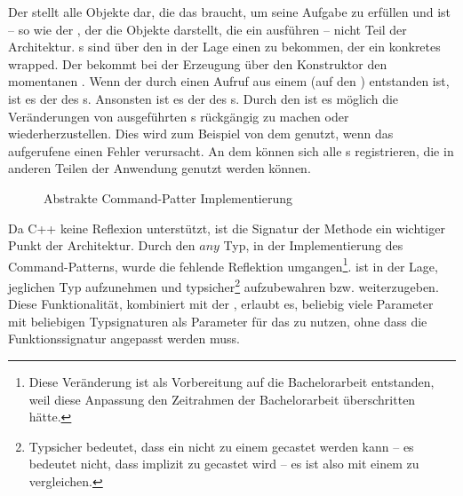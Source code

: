      Der  stellt alle Objekte dar, die das  braucht, um seine Aufgabe zu erfüllen und ist -- so wie der , der die Objekte darstellt, die ein  ausführen -- nicht Teil der Architektur. s sind über den  in der Lage einen  zu bekommen, der ein konkretes  wrapped. Der  bekommt bei der Erzeugung über den Konstruktor den momentanen . Wenn der  durch einen Aufruf aus einem  (auf den ) entstanden ist, ist es der  des s. Ansonsten ist es der  des s. Durch den  ist es möglich die Veränderungen von ausgeführten s rückgängig zu machen oder wiederherzustellen. Dies wird zum Beispiel von dem  genutzt, wenn das aufgerufene  einen Fehler verursacht. An dem  können sich alle s registrieren, die in anderen Teilen der Anwendung genutzt werden können.

      \begin{figure}[H]
        \centering
        \caption{Abstrakte Command-Patter Implementierung}
        \label{fig:commanduml}
      \end{figure}

      Da C++ keine Reflexion \autocites{vinoski2005time}{ferber1989computational} unterstützt, ist die Signatur der  Methode ein wichtiger Punkt der Architektur. Durch den \myTIn$any$ \autocite{cpp-fundamentals} Typ, in der Implementierung des Command-Patterns, wurde die fehlende Reflektion umgangen\footnote{
         Diese Veränderung ist als Vorbereitung auf die Bachelorarbeit entstanden, weil diese Anpassung den Zeitrahmen der Bachelorarbeit überschritten hätte.
      }.  ist in der Lage, jeglichen Typ aufzunehmen und typsicher\footnote{
        Typsicher bedeutet, dass ein  nicht zu einem  gecastet werden kann -- es bedeutet nicht, dass  implizit zu  gecastet wird -- es ist also mit einem  zu vergleichen.
      } aufzubewahren bzw. weiterzugeben. Diese Funktionalität, kombiniert mit der , erlaubt es, beliebig viele Parameter mit beliebigen Typsignaturen als Parameter für das  zu nutzen, ohne dass die Funktionssignatur angepasst werden muss.

